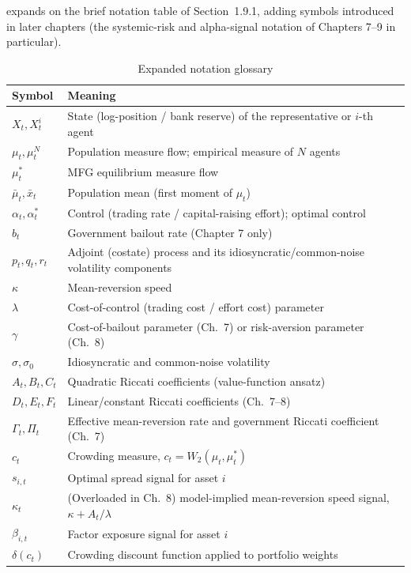  expands on the brief notation table of Section~1.9.1,
adding symbols introduced in later chapters (the systemic-risk and alpha-signal
notation of Chapters 7--9 in particular).

\begin{table}[ht]
\centering
\small
\caption{Expanded notation glossary}
\label{tab:appC-notation}
\begin{tabular}{p{2.6cm}p{9.5cm}}
\toprule
\textbf{Symbol} & \textbf{Meaning} \\
\midrule
$X_t, X_t^i$ & State (log-position / bank reserve) of the representative or
    $i$-th agent \\
$\mu_t, \mu_t^N$ & Population measure flow; empirical measure of $N$ agents \\
$\mu_t^*$ & MFG equilibrium measure flow \\
$\bar\mu_t, \bar{x}_t$ & Population mean (first moment of $\mu_t$) \\
$\alpha_t, \alpha_t^*$ & Control (trading rate / capital-raising effort);
    optimal control \\
$b_t$ & Government bailout rate (Chapter 7 only) \\
$p_t, q_t, r_t$ & Adjoint (costate) process and its idiosyncratic/common-noise
    volatility components \\
$\kappa$ & Mean-reversion speed \\
$\lambda$ & Cost-of-control (trading cost / effort cost) parameter \\
$\gamma$ & Cost-of-bailout parameter (Ch.\ 7) or risk-aversion parameter (Ch.\ 8) \\
$\sigma, \sigma_0$ & Idiosyncratic and common-noise volatility \\
$A_t, B_t, C_t$ & Quadratic Riccati coefficients (value-function ansatz) \\
$D_t, E_t, F_t$ & Linear/constant Riccati coefficients (Ch.\ 7--8) \\
$\Gamma_t, \Pi_t$ & Effective mean-reversion rate and government Riccati
    coefficient (Ch.\ 7) \\
$c_t$ & Crowding measure, $c_t = W_2(\mu_t, \mu_t^*)$ \\
$s_{i,t}$ & Optimal spread signal for asset $i$ \\
$\kappa_t$ & (Overloaded in Ch.\ 8) model-implied mean-reversion speed signal,
    $\kappa + A_t/\lambda$ \\
$\beta_{i,t}$ & Factor exposure signal for asset $i$ \\
$\delta(c_t)$ & Crowding discount function applied to portfolio weights \\

\end{tabular}
\end{table}
